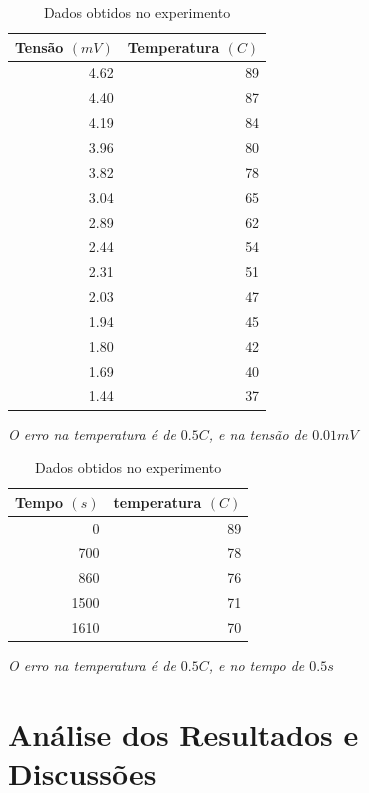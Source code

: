 \documentclass[12pt,a4paper]{article}
\begin{document}
\begin{table}[!htbp]

\centering
\def\arraystretch{1.5}
\caption{Dados obtidos no experimento}

\begin{tabular}{|r|r|}
\hline
Tensão $(mV)$ & Temperatura $(C)$\\
\hline
 4.62 & 89 \\
 \hline
 4.40  & 87 \\
 \hline
 4.19 & 84 \\
 \hline
 3.96 & 80 \\
 \hline
 3.82 & 78 \\
 \hline
 3.04 & 65 \\
 \hline
 2.89 & 62 \\
 \hline
 2.44 & 54 \\
 \hline
 2.31 & 51 \\
 \hline
 2.03 & 47 \\
 \hline
 1.94 & 45 \\
 \hline
 1.80  & 42 \\
 \hline
 1.69 & 40 \\
 \hline
 1.44 & 37 \\
\hline
\end{tabular}

\emph{O erro na temperatura é de $0.5 C$, e na tensão de $0.01 mV$}
\label{dados}
\end{table}

\begin{table}[!htbp]

\centering
\def\arraystretch{1.5}
\caption{Dados obtidos no experimento}

\begin{tabular}{|r|r|}
\hline
Tempo $(s)$ & temperatura $(C)$ \\
\hline
    0 & 89 \\    
  700 & 78 \\
  860 & 76 \\
 1500 & 71 \\
 1610 & 70 \\
\hline
\end{tabular}

\emph{O erro na temperatura é de $0.5 C$, e no tempo de $0.5 s$}
\label{dados}
\end{table}


\section{Análise dos Resultados e Discussões}
\end{document}
